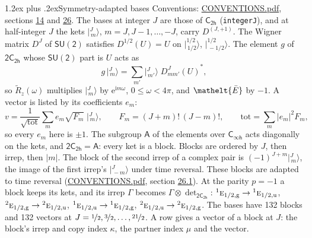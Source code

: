 \documentclass[10pt,a4paper]{article}
\makeatletter
\renewcommand\section{\@startsection{section}{1}{\z@}{-3ex plus -1ex minus -.2ex}%
  {1.2ex plus .2ex}{\normalfont\large\sffamily\bfseries\color{parttitle}}}
\numberwithin{equation}{section}
\newcommand{\eltfont}[1]{{\let\sigma\eltsigma\mathelt{#1}}}
\newcommand{\grp}[1]{\mathsf{#1}}
\newcommand{\irr}[1]{\text{\normalfont\scshape #1}}
\newcommand{\conjpair}[1]{{}^{#1}}
\newcommand{\elt}[1]{\eltfont{#1}}
\newcommand{\ptag}[1]{\mathrm{#1}}
\newcommand{\iunit}{\mathrm{i}}
\newcommand{\expe}{\mathrm{e}}
\newcommand{\irrJp}[2]{D^{(#1,#2)}}
\newcommand{\wignerD}[1]{D^{#1}}
\newcommand{\conj}[1]{{#1}^{*}}
\newcommand{\irrprod}{\otimes}
\newcommand{\mult}{\kappa}
\newcommand{\intx}{\mu}
\newcommand{\jm}[2]{\bigl\lvert{}^{#1}_{\,#2}\bigr\rangle}
\newcommand{\barred}[1]{\bar{#1}}
\newcommand{\lift}[1]{\tilde{#1}}
\makeatother
\begin{document}
\section{Symmetry-adapted bases}\label{s:bases}
Conventions: \href{../../CONVENTIONS.pdf}{CONVENTIONS.pdf}, sections \href{../../../rotation/CONVENTIONS.pdf\#conv.14}{14} and \href{../../CONVENTIONS.pdf\#conv.26}{26}.
\leavevmode\label{n:index.m}\label{n:vector.ket}The bases at integer $J$ are those of \href{../../../rotation/data/pdf/C2h.pdf}{$\grp{C_{2h}}$} (\texttt{integerJ}), and at half-integer $J$ the kets $\jm{J}{m}$, $m = J, J-1, \dots, -J$, carry $\irrJp{J}{+1}$. \label{n:matrix.wigner}The Wigner matrix $\wignerD{J}$ of $\grp{SU(2)}$ satisfies $\wignerD{1/2}(U) = U$ on $\jm{1/2}{1/2}$, $\jm{1/2}{-1/2}$. The element $g$ of $\grp{2C_{2h}}$ whose $\grp{SU(2)}$ part is $U$ acts as
\begin{equation}\label{e:action}g\,\jm{J}{m} = \sum_{m'} \jm{J}{m'}\; \conj{\wignerD{J}_{m m'}(U)},\end{equation}
so $\lift{R}_{z}(\omega)$ multiplies $\jm{J}{m}$ by $\expe^{\iunit m\omega}$, $0 \le \omega < 4\pi$, and $\elt{\barred{E}}$ by $-1$. \label{n:index.ketcoefficient}\label{n:vector.basis.symmetry}\label{n:index.ketweight}\label{n:index.total}A vector is listed by its coefficients $e_m$:
\begin{equation}\label{e:ket}v = \frac{1}{\sqrt{\mathrm{tot}}}\sum_m e_m\sqrt{F_m}\;\jm{J}{m},\qquad F_m = (J+m)!\,(J-m)!,\qquad \mathrm{tot} = \sum_m |e_m|^2F_m,\end{equation}
so every $e_m$ here is $\pm 1$.
\leavevmode\label{n:group.A}The subgroup $\grp{A}$ of the elements over $\grp{C_{\infty h}}$ acts diagonally on the kets, and $\grp{2C_{2h}} = \grp{A}$: every ket is a block. Blocks are ordered by $J$, then irrep, then $|m|$. The block of the second irrep of a complex pair is $(-1)^{J+m}\jm{J}{m}$, the image of the first irrep's $\jm{J}{-m}$ under time reversal. These blocks are adapted to time reversal (\href{../../CONVENTIONS.pdf}{CONVENTIONS.pdf}, section \href{../../CONVENTIONS.pdf\#conv.26.1}{26.1}).
At the parity $p = -1$ a block keeps its kets, and its irrep $\Gamma$ becomes $\Gamma \irrprod \det_{\grp{2C_{2h}}}$: $\conjpair{1}\irr{e}_{1/2,\ptag{g}} \to \conjpair{1}\irr{e}_{1/2,\ptag{u}}$, $\conjpair{2}\irr{e}_{1/2,\ptag{g}} \to \conjpair{2}\irr{e}_{1/2,\ptag{u}}$, $\conjpair{1}\irr{e}_{1/2,\ptag{u}} \to \conjpair{1}\irr{e}_{1/2,\ptag{g}}$, $\conjpair{2}\irr{e}_{1/2,\ptag{u}} \to \conjpair{2}\irr{e}_{1/2,\ptag{g}}$.
The bases have 132 blocks and 132 vectors at $J = \nicefrac{1}{2}, \nicefrac{3}{2}, \dots, \nicefrac{21}{2}$. \label{n:index.copy}\label{n:head.vector}A row gives a vector of a block at $J$: the block's irrep and copy index $\mult$, the partner index $\intx$ and the vector.
\end{document}
